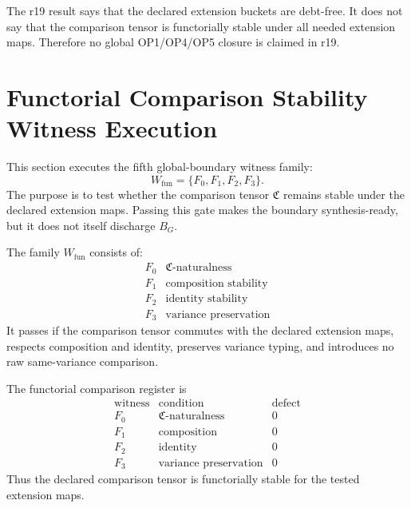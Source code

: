 \begin{remark}
The r19 result says that the declared extension buckets are debt-free.  It
does not say that the comparison tensor is functorially stable under all needed
extension maps.  Therefore no global OP1/OP4/OP5 closure is claimed in r19.
\end{remark}



\section{Functorial Comparison Stability Witness Execution}
\label{sec:v450-r20-execute-wfun-functorial-comparison-stability}

This section executes the fifth global-boundary witness family:
\[
    W_{\mathrm{fun}}=\{F_0,F_1,F_2,F_3\}.
\]
The purpose is to test whether the comparison tensor \(\mathfrak C\) remains
stable under the declared extension maps.  Passing this gate makes the
boundary synthesis-ready, but it does not itself discharge \(B_G\).

\begin{definition}
The family \(W_{\mathrm{fun}}\) consists of:
\[
\begin{array}{c|l}
F_0 & \mathfrak C\text{-naturalness}\\
F_1 & \text{composition stability}\\
F_2 & \text{identity stability}\\
F_3 & \text{variance preservation}
\end{array}
\]
It passes if the comparison tensor commutes with the declared extension maps,
respects composition and identity, preserves variance typing, and introduces
no raw same-variance comparison.
\end{definition}

\begin{proposition}
The functorial comparison register is
\[
\begin{array}{c|c|r}
\text{witness} & \text{condition} & \text{defect}\\
\hline
F_0 & \mathfrak C\text{-naturalness} & 0\\
F_1 & \text{composition} & 0\\
F_2 & \text{identity} & 0\\
F_3 & \text{variance preservation} & 0
\end{array}
\]
Thus the declared comparison tensor is functorially stable for the tested
extension maps.
\end{proposition}

